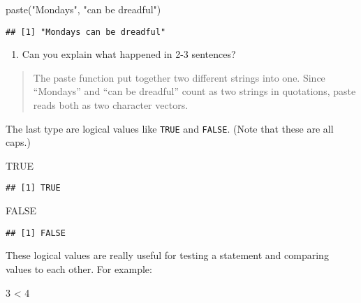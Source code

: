 \documentclass[
]{article}
\newenvironment{Shaded}{\begin{snugshade}}{\end{snugshade}}
\newcommand{\ConstantTok}[1]{\textcolor[rgb]{0.00,0.00,0.00}{#1}}
\newcommand{\DecValTok}[1]{\textcolor[rgb]{0.00,0.00,0.81}{#1}}
\newcommand{\FunctionTok}[1]{\textcolor[rgb]{0.00,0.00,0.00}{#1}}
\newcommand{\NormalTok}[1]{#1}
\newcommand{\SpecialCharTok}[1]{\textcolor[rgb]{0.00,0.00,0.00}{#1}}
\newcommand{\StringTok}[1]{\textcolor[rgb]{0.31,0.60,0.02}{#1}}
\providecommand{\tightlist}{%
  \setlength{\itemsep}{0pt}\setlength{\parskip}{0pt}}
\begin{document}
\begin{Shaded}
\begin{Highlighting}[]
\FunctionTok{paste}\NormalTok{(}\StringTok{"Mondays"}\NormalTok{, }\StringTok{"can be dreadful"}\NormalTok{)}
\end{Highlighting}
\end{Shaded}

\begin{verbatim}
## [1] "Mondays can be dreadful"
\end{verbatim}

\begin{enumerate}
\def\labelenumi{(\arabic{enumi})}
\setcounter{enumi}{4}
\tightlist
\item
  Can you explain what happened in 2-3 sentences?
\end{enumerate}

\begin{quote}
The paste function put together two different strings into one. Since
``Mondays'' and ``can be dreadful'' count as two strings in quotations,
paste reads both as two character vectors.
\end{quote}

The last type are logical values like \texttt{TRUE} and \texttt{FALSE}.
(Note that these are all caps.)

\begin{Shaded}
\begin{Highlighting}[]
\ConstantTok{TRUE}
\end{Highlighting}
\end{Shaded}

\begin{verbatim}
## [1] TRUE
\end{verbatim}

\begin{Shaded}
\begin{Highlighting}[]
\ConstantTok{FALSE}
\end{Highlighting}
\end{Shaded}

\begin{verbatim}
## [1] FALSE
\end{verbatim}

These logical values are really useful for testing a statement and
comparing values to each other. For example:

\begin{Shaded}
\begin{Highlighting}[]
\DecValTok{3} \SpecialCharTok{\textless{}} \DecValTok{4}
\end{Highlighting}
\end{Shaded}
\end{document}
